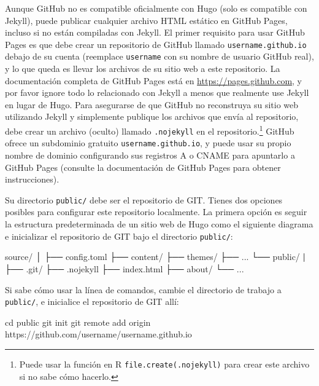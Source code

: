 \documentclass[12pt,]{krantz}
\makeatletter
\newenvironment{Shaded}{\begin{snugshade}}{\end{snugshade}}
\newcommand{\BuiltInTok}[1]{#1}
\newcommand{\ExtensionTok}[1]{#1}
\newcommand{\FunctionTok}[1]{\textcolor[rgb]{0.00,0.00,0.00}{#1}}
\newcommand{\KeywordTok}[1]{\textcolor[rgb]{0.13,0.29,0.53}{\textbf{#1}}}
\newcommand{\NormalTok}[1]{#1}
\newenvironment{kframe}{%
\medskip{}
\setlength{\fboxsep}{.8em}
 \def\at@end@of@kframe{}%
 \ifinner\ifhmode%
  \def\at@end@of@kframe{\end{minipage}}%
  \begin{minipage}{\columnwidth}%
 \fi\fi%
 \def\FrameCommand##1{\hskip\@totalleftmargin \hskip-\fboxsep
 \colorbox{shadecolor}{##1}\hskip-\fboxsep
     \hskip-\linewidth \hskip-\@totalleftmargin \hskip\columnwidth}%
 \MakeFramed {\advance\hsize-\width
   \@totalleftmargin\z@ \linewidth\hsize
   \@setminipage}}%
 {\par\unskip\endMakeFramed%
 \at@end@of@kframe}
\renewenvironment{Shaded}{\begin{kframe}}{\end{kframe}}
\theoremstyle{definition}
\theoremstyle{definition}
\theoremstyle{definition}
\theoremstyle{remark}
\makeatother
\begin{document}
Aunque GitHub no es compatible oficialmente con Hugo (solo es compatible
con Jekyll), puede publicar cualquier archivo HTML estático en GitHub
Pages, incluso si no están compiladas con Jekyll. El primer requisito
para usar GitHub Pages es que debe crear un repositorio de GitHub
llamado \texttt{username.github.io} debajo de su cuenta (reemplace
\texttt{username} con su nombre de usuario GitHub real), y lo que queda
es llevar los archivos de su sitio web a este repositorio. La
documentación completa de GitHub Pages está en
\url{https://pages.github.com}, y por favor ignore todo lo relacionado
con Jekyll a menos que realmente use Jekyll en lugar de Hugo. Para
asegurarse de que GitHub no reconstruya su sitio web utilizando Jekyll y
simplemente publique los archivos que envía al repositorio, debe crear
un archivo (oculto) llamado \texttt{.nojekyll} en el
repositorio.\footnote{Puede usar la función en R
  \texttt{file.create(\textquotesingle{}.nojekyll\textquotesingle{})}
  para crear este archivo si no sabe cómo hacerlo.} GitHub ofrece un
subdominio gratuito \texttt{username.github.io}, y puede usar su propio
nombre de dominio configurando sus registros A o CNAME para apuntarlo a
GitHub Pages (consulte la documentación de GitHub Pages para obtener
instrucciones).

Su directorio \texttt{public/} debe ser el repositorio de GIT. Tienes
dos opciones posibles para configurar este repositorio localmente. La
primera opción es seguir la estructura predeterminada de un sitio web de
Hugo como el siguiente diagrama e inicializar el repositorio de GIT bajo
el directorio \texttt{public/}:

\begin{Shaded}
\begin{Highlighting}[]
\ExtensionTok{source/}
\NormalTok{│}
\NormalTok{├── }\ExtensionTok{config.toml}
\NormalTok{├── }\ExtensionTok{content/}
\NormalTok{├── }\ExtensionTok{themes/}
\NormalTok{├── }\ExtensionTok{...}
\NormalTok{└── }\ExtensionTok{public/}
    \KeywordTok{|}
\NormalTok{    ├── }\ExtensionTok{.git/}
\NormalTok{    ├── }\ExtensionTok{.nojekyll}
\NormalTok{    ├── }\ExtensionTok{index.html}
\NormalTok{    ├── }\ExtensionTok{about/}
\NormalTok{    └── }\ExtensionTok{...}
\end{Highlighting}
\end{Shaded}

Si sabe cómo usar la línea de comandos, cambie el directorio de trabajo
a \texttt{public/}, e inicialice el repositorio de GIT allí:

\begin{Shaded}
\begin{Highlighting}[]
\BuiltInTok{cd}\NormalTok{ public}
\FunctionTok{git}\NormalTok{ init}
\FunctionTok{git}\NormalTok{ remote add origin https://github.com/username/username.github.io}
\end{Highlighting}
\end{Shaded}
\end{document}
